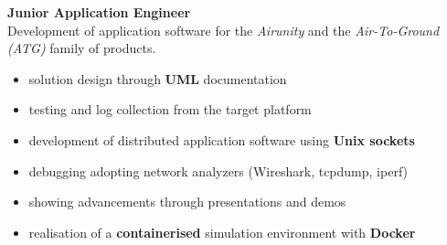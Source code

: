 \documentclass[letterpaper]{twentysecondcv} %
\begin{document}
\begin{twenty}
{            \vspace{1 mm}
            \textbf{Junior Application Engineer}\\
            Development of application software for the \textit{Airunity} and the \textit{Air-To-Ground (ATG)} family of products.
            \vspace{1 mm}
            \begin{itemize}
                \item solution design through \textbf{UML} documentation
                \item testing and log collection from the target platform
                \item development of distributed application software using \textbf{Unix sockets}
                \item debugging adopting network analyzers (Wireshark, tcpdump, iperf)
                \item showing advancements through presentations and demos
                \item realisation of a \textbf{containerised} simulation environment with \textbf{Docker}
            \end{itemize}

}
\end{twenty}
\end{document}
